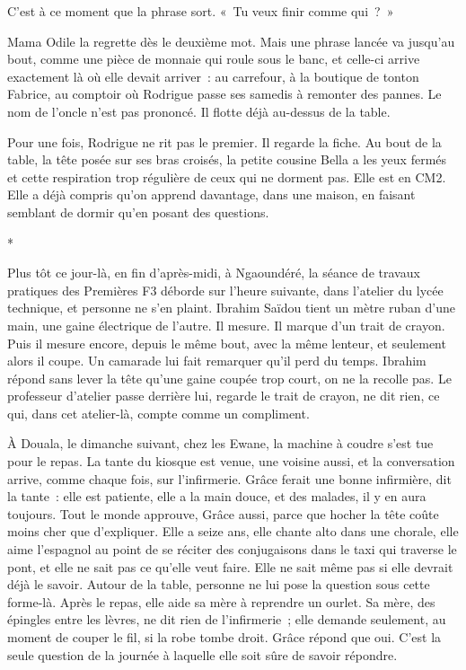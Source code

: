 \documentclass[10.5pt,twoside,openright]{book}
\newcommand{\asterisme}{\par\vspace{0.7em}\centerline{\color{gris}*\quad*\quad*}\vspace{0.7em}\par\noindent}
\begin{document}
C’est à ce moment que la phrase sort. « Tu veux finir comme qui ? »

Mama Odile la regrette dès le deuxième mot. Mais une phrase lancée va jusqu’au bout, comme une pièce de monnaie qui roule sous le banc, et celle-ci arrive exactement là où elle devait arriver : au carrefour, à la boutique de tonton Fabrice, au comptoir où Rodrigue passe ses samedis à remonter des pannes. Le nom de l’oncle n’est pas prononcé. Il flotte déjà au-dessus de la table.

Pour une fois, Rodrigue ne rit pas le premier. Il regarde la fiche. Au bout de la table, la tête posée sur ses bras croisés, la petite cousine Bella a les yeux fermés et cette respiration trop régulière de ceux qui ne dorment pas. Elle est en CM2. Elle a déjà compris qu’on apprend davantage, dans une maison, en faisant semblant de dormir qu’en posant des questions.

\asterisme

Plus tôt ce jour-là, en fin d’après-midi, à Ngaoundéré, la séance de travaux pratiques des Premières F3 déborde sur l’heure suivante, dans l’atelier du lycée technique, et personne ne s’en plaint. Ibrahim Saïdou tient un mètre ruban d’une main, une gaine électrique de l’autre. Il mesure. Il marque d’un trait de crayon. Puis il mesure encore, depuis le même bout, avec la même lenteur, et seulement alors il coupe. Un camarade lui fait remarquer qu’il perd du temps. Ibrahim répond sans lever la tête qu’une gaine coupée trop court, on ne la recolle pas. Le professeur d’atelier passe derrière lui, regarde le trait de crayon, ne dit rien, ce qui, dans cet atelier-là, compte comme un compliment.

À Douala, le dimanche suivant, chez les Ewane, la machine à coudre s’est tue pour le repas. La tante du kiosque est venue, une voisine aussi, et la conversation arrive, comme chaque fois, sur l’infirmerie. Grâce ferait une bonne infirmière, dit la tante : elle est patiente, elle a la main douce, et des malades, il y en aura toujours. Tout le monde approuve, Grâce aussi, parce que hocher la tête coûte moins cher que d’expliquer. Elle a seize ans, elle chante alto dans une chorale, elle aime l’espagnol au point de se réciter des conjugaisons dans le taxi qui traverse le pont, et elle ne sait pas ce qu’elle veut faire. Elle ne sait même pas si elle devrait déjà le savoir. Autour de la table, personne ne lui pose la question sous cette forme-là. Après le repas, elle aide sa mère à reprendre un ourlet. Sa mère, des épingles entre les lèvres, ne dit rien de l’infirmerie ; elle demande seulement, au moment de couper le fil, si la robe tombe droit. Grâce répond que oui. C’est la seule question de la journée à laquelle elle soit sûre de savoir répondre.
\end{document}

